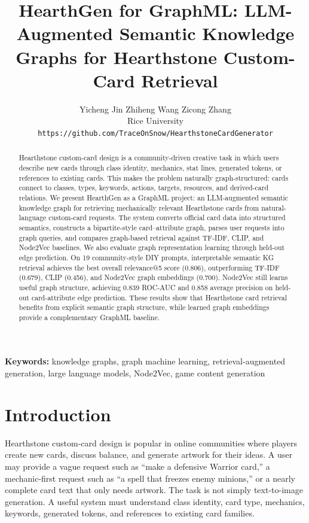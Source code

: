 \documentclass{article}
\title{HearthGen for GraphML: LLM-Augmented Semantic Knowledge Graphs for Hearthstone Custom-Card Retrieval}
\author{
Yicheng Jin \quad Zhiheng Wang \quad Zicong Zhang\\
Rice University\\
\texttt{https://github.com/TraceOnSnow/HearthstoneCardGenerator}
}
\newcommand{\keywords}[1]{\vspace{0.6em}\noindent\textbf{Keywords:} #1}
\begin{document}
\maketitle

\begin{abstract}
Hearthstone custom-card design is a community-driven creative task in which users describe new cards through class identity, mechanics, stat lines, generated tokens, or references to existing cards. This makes the problem naturally graph-structured: cards connect to classes, types, keywords, actions, targets, resources, and derived-card relations. We present HearthGen as a GraphML project: an LLM-augmented semantic knowledge graph for retrieving mechanically relevant Hearthstone cards from natural-language custom-card requests. The system converts official card data into structured semantics, constructs a bipartite-style card--attribute graph, parses user requests into graph queries, and compares graph-based retrieval against TF-IDF, CLIP, and Node2Vec baselines. We also evaluate graph representation learning through held-out edge prediction. On 19 community-style DIY prompts, interpretable semantic KG retrieval achieves the best overall relevance@5 score (0.806), outperforming TF-IDF (0.679), CLIP (0.456), and Node2Vec graph embeddings (0.700). Node2Vec still learns useful graph structure, achieving 0.839 ROC-AUC and 0.858 average precision on held-out card-attribute edge prediction. These results show that Hearthstone card retrieval benefits from explicit semantic graph structure, while learned graph embeddings provide a complementary GraphML baseline.
\end{abstract}

\keywords{knowledge graphs, graph machine learning, retrieval-augmented generation, large language models, Node2Vec, game content generation}

\section{Introduction}

Hearthstone custom-card design is popular in online communities where players create new cards, discuss balance, and generate artwork for their ideas. A user may provide a vague request such as ``make a defensive Warrior card,'' a mechanic-first request such as ``a spell that freezes enemy minions,'' or a nearly complete card text that only needs artwork. The task is not simply text-to-image generation. A useful system must understand class identity, card type, mechanics, keywords, generated tokens, and references to existing card families.
\end{document}
